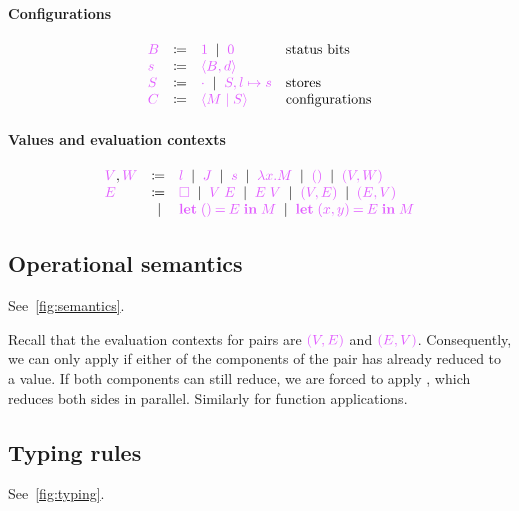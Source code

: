 \documentclass[main.tex]{subfiles}
\begin{document}
\paragraph*{Configurations}
\[
\begin{array}{lrll}
  \tm{B}
  & \coloneqq & \tm{1}
    \sep        \tm{0} & \text{status bits}
  \\
  \tm{s}
  & \coloneqq & \tm{\langle B, d \rangle}
  \\
  \tm{S}
  & \coloneqq & \tm{\emptyenv}
    \sep        \tm{S, l \mapsto s} & \text{stores}
  \\
  \tm{C}
  & \coloneqq & \tm{\config{M}{S}} & \text{configurations}
\end{array}
\]

\paragraph*{Values and evaluation contexts}
\[
\begin{array}{lrll}
  \tm{V}, \tm{W}
  & \coloneqq & \tm{l}
    \sep        \tm{J}
    \sep        \tm{s}
    \sep        \tm{\lambda x.M}
    \sep        \tm{\unit}
    \sep        \tm{\pair{V}{W}}
  \\
  \tm{E}
  & \coloneqq & \tm{\hole}
    \sep        \tm{V\; E}
    \sep        \tm{E\; V}
    \sep        \tm{(V, E)}
    \sep        \tm{(E, V)} \\
  & \sep      & \tm{\letunit{E}{M}}
    \sep        \tm{\letpair{x}{y}{E}{M}}
\end{array}
\]

\subsection{Operational semantics}
\label{sec:lvar-semantics}

See~\cref{fig:semantics}.

Recall that the evaluation contexts for pairs are $\tm{(V, E)}$ and $\tm{(E, V)}$. Consequently, we can only apply  if either of the components of the pair has already reduced to a value. If both components can still reduce, we are forced to apply , which reduces both sides in parallel. Similarly for function applications.

\subsection{Typing rules}%
\label{sec:lvar-typing}

See~\cref{fig:typing}.
\end{document}

